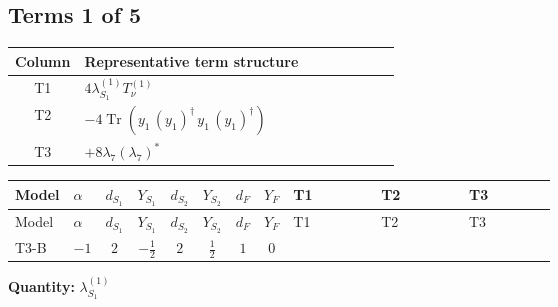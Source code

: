 \documentclass[8pt]{article}
\begin{document}
\begin{landscape}
\subsection*{Terms 1 of 5}
\begin{center}
\begin{tabular}{@{}c >{\raggedright\arraybackslash}p{0.82\linewidth}@{}}
\toprule
Column & Representative term structure \\
\midrule
T1 & \(\displaystyle 4 {\lambda_{S_1}^{(1)}} T_{\nu}^{(1)}\) \\
\midrule
T2 & \(\displaystyle -4 \operatorname{Tr}\!\left({y_1}\,\left({y_1}\right)^{\dagger}\,{y_1}\,\left({y_1}\right)^{\dagger}\right)\) \\
\midrule
T3 & \(\displaystyle +8 {\lambda_{7}} \left({\lambda_{7}}\right)^{*}\) \\
\midrule
\bottomrule
\end{tabular}
\end{center}
\smallskip
\tiny
\begin{longtable}{@{}llcccccc >{\raggedright\arraybackslash}p{0.21\linewidth} >{\raggedright\arraybackslash}p{0.21\linewidth} >{\raggedright\arraybackslash}p{0.21\linewidth}@{}}
\toprule
Model & $\alpha$ & $d_{S_1}$ & $Y_{S_1}$ & $d_{S_2}$ & $Y_{S_2}$ & $d_F$ & $Y_F$ & T1 & T2 & T3 \\
\midrule
\endfirsthead
\toprule
Model & $\alpha$ & $d_{S_1}$ & $Y_{S_1}$ & $d_{S_2}$ & $Y_{S_2}$ & $d_F$ & $Y_F$ & T1 & T2 & T3 \\
\midrule
\endhead
T3-B & $-1$ & $2$ & $-\frac{1}{2}$ & $2$ & $\frac{1}{2}$ & $1$ & $0$ & \scriptsize\adjustbox{max width=\linewidth}{$\begin{gathered} 4 {\lambda_{S_1}^{(1)}} T_{\nu}^{(1)}\end{gathered}$} & \scriptsize\adjustbox{max width=\linewidth}{$\begin{gathered} -4 \operatorname{Tr}\!\left({y_1}\,\left({y_1}\right)^{\dagger}\,{y_1}\,\left({y_1}\right)^{\dagger}\right)\end{gathered}$} & \scriptsize\adjustbox{max width=\linewidth}{$\begin{gathered} +8 {\lambda_{7}} \left({\lambda_{7}}\right)^{*}\end{gathered}$} \\
\midrule
\bottomrule
\end{longtable}
\clearpage
\noindent\textbf{Quantity: }$\lambda_{S_1}^{(1)}$\par\smallskip

\end{landscape}
\end{document}
